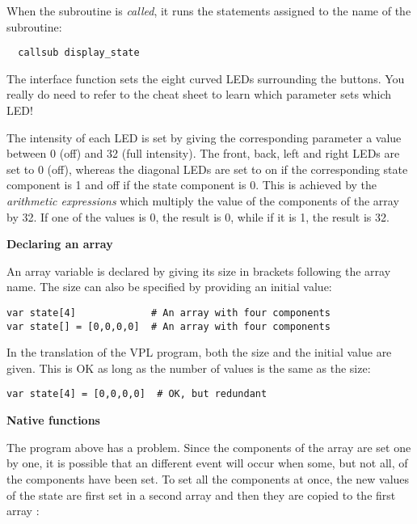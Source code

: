 When the subroutine is \emph{called}, it runs the statements assigned to
the name of the subroutine:
\vspace{-1ex}
\begin{footnotesize}
\begin{verbatim}
  callsub display_state
\end{verbatim}
\end{footnotesize}
\vspace{-1ex}
The interface function  sets the eight curved LEDs
surrounding the buttons. You really do need to refer to the cheat sheet
to learn which parameter sets which LED!

The intensity of each LED is set by giving the corresponding parameter a
value between 0 (off) and 32 (full intensity). The front, back,
left and right LEDs are set to 0 (off), whereas the diagonal LEDs are
set to on if the corresponding state component is 1 and off if the state
component is 0. This is achieved by the \emph{arithmetic expressions}
 which multiply the value of the components of the array
by 32. If one of the values is 0, the result is 0, while if it is 1, the
result is 32.

\textbf{\large Declaring an array}

An array variable is declared by giving its size in brackets following
the array name. The size can also be specified by providing an initial
value:

\begin{footnotesize}
\begin{verbatim}
var state[4]             # An array with four components
var state[] = [0,0,0,0]  # An array with four components
\end{verbatim}
\end{footnotesize}

In the translation of the VPL program, both the size and the initial
value are given. This is OK as long as the number of values is the same
as the size:

\begin{footnotesize}
\begin{verbatim}
var state[4] = [0,0,0,0]  # OK, but redundant
\end{verbatim}
\end{footnotesize}

\textbf{\large Native functions}

The program above has a problem. Since the components of the array
 are set one by one, it is possible that an different event
will occur when some, but not all, of the components have been set. To
set all the components at once, the new values of the state are first
set in a second array  and then they are copied to the
first array :

